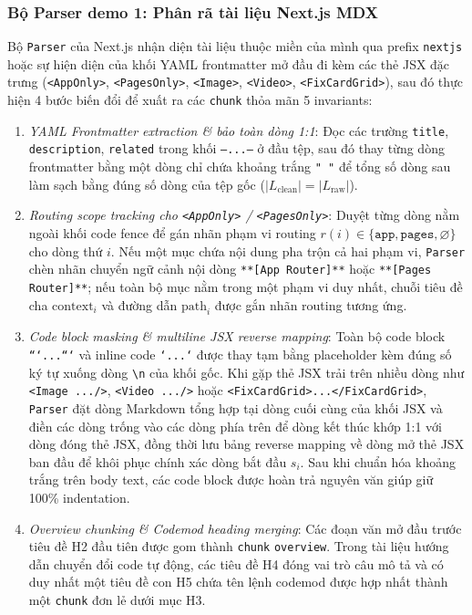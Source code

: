 \subsubsection{Bộ Parser demo 1: Phân rã tài liệu Next.js MDX}
Bộ \texttt{Parser} của Next.js nhận diện tài liệu thuộc miền của mình qua prefix \texttt{nextjs} hoặc sự hiện diện của khối YAML frontmatter mở đầu đi kèm các thẻ JSX đặc trưng (\texttt{<AppOnly>}, \texttt{<PagesOnly>}, \texttt{<Image>}, \texttt{<Video>}, \texttt{<FixCardGrid>}), sau đó thực hiện 4 bước biến đổi để xuất ra các \texttt{chunk} thỏa mãn 5 invariants:
\begin{enumerate}
    \item \textit{YAML Frontmatter extraction \& bảo toàn dòng 1:1}: Đọc các trường \texttt{title}, \texttt{description}, \texttt{related} trong khối \texttt{---...---} ở đầu tệp, sau đó thay từng dòng frontmatter bằng một dòng chỉ chứa khoảng trắng \texttt{" "} để tổng số dòng sau làm sạch bằng đúng số dòng của tệp gốc ($|L_{\text{clean}}| = |L_{\text{raw}}|$).
    \item \textit{Routing scope tracking cho \texttt{<AppOnly>} / \texttt{<PagesOnly>}}: Duyệt từng dòng nằm ngoài khối code fence để gán nhãn phạm vi routing $r(i) \in \{\texttt{app}, \texttt{pages}, \varnothing\}$ cho dòng thứ $i$. Nếu một mục chứa nội dung pha trộn cả hai phạm vi, \texttt{Parser} chèn nhãn chuyển ngữ cảnh nội dòng \texttt{**[App Router]**} hoặc \texttt{**[Pages Router]**}; nếu toàn bộ mục nằm trong một phạm vi duy nhất, chuỗi tiêu đề cha $\text{context}_i$ và đường dẫn $\text{path}_i$ được gắn nhãn routing tương ứng.
    \item \textit{Code block masking \& multiline JSX reverse mapping}: Toàn bộ code block \texttt{```...```} và inline code \texttt{`...`} được thay tạm bằng placeholder kèm đúng số ký tự xuống dòng \texttt{\textbackslash n} của khối gốc. Khi gặp thẻ JSX trải trên nhiều dòng như \texttt{<Image .../>}, \texttt{<Video .../>} hoặc \texttt{<FixCardGrid>...\textless/FixCardGrid>}, \texttt{Parser} đặt dòng Markdown tổng hợp tại dòng cuối cùng của khối JSX và điền các dòng trống vào các dòng phía trên để dòng kết thúc khớp 1:1 với dòng đóng thẻ JSX, đồng thời lưu bảng reverse mapping về dòng mở thẻ JSX ban đầu để khôi phục chính xác dòng bắt đầu $s_i$. Sau khi chuẩn hóa khoảng trắng trên body text, các code block được hoàn trả nguyên văn giúp giữ 100\% indentation.
    \item \textit{Overview chunking \& Codemod heading merging}: Các đoạn văn mở đầu trước tiêu đề H2 đầu tiên được gom thành \texttt{chunk} \texttt{overview}. Trong tài liệu hướng dẫn chuyển đổi code tự động, các tiêu đề H4 đóng vai trò câu mô tả và có duy nhất một tiêu đề con H5 chứa tên lệnh codemod được hợp nhất thành một \texttt{chunk} đơn lẻ dưới mục H3.
\end{enumerate}

